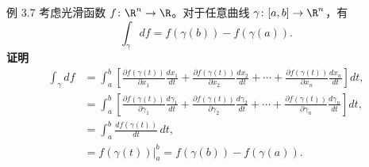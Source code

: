 \begin{statement}{例 3.7}{}
考虑光滑函数 $f\colon\R^n\to\R$。对于任意曲线 $\gamma\colon[a,b]\to\R^n$，有
\[
  \int_\gamma df=f(\gamma(b))-f(\gamma(a)).
\]
\textbf{证明}
\begin{align*}
  \int_\gamma df
   &=\int_a^b
      \left[\frac{\partial f(\gamma(t))}{\partial x_1}\frac{dx_1}{dt}
          +\frac{\partial f(\gamma(t))}{\partial x_2}\frac{dx_2}{dt}
          +\cdots+\frac{\partial f(\gamma(t))}{\partial x_n}\frac{dx_n}{dt}\right]dt,\\
   &=\int_a^b
      \left[\frac{\partial f(\gamma(t))}{\partial\gamma_1}\frac{d\gamma_1}{dt}
          +\frac{\partial f(\gamma(t))}{\partial\gamma_2}\frac{d\gamma_2}{dt}
          +\cdots+\frac{\partial f(\gamma(t))}{\partial\gamma_n}\frac{d\gamma_n}{dt}\right]dt,\\
   &=\int_a^b\frac{df(\gamma(t))}{dt}\,dt,\\
   &=\left.f(\gamma(t))\right|_a^b=f(\gamma(b))-f(\gamma(a)).
\end{align*}
\end{statement}
